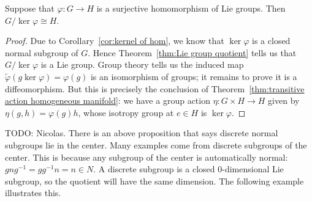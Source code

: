 \begin{theorem}
\label{thm:first iso}
Suppose that $\varphi: G \to H$ is a surjective homomorphism of Lie groups.
Then $G / \ker \varphi \cong H$.
\end{theorem}
\begin{proof}
Due to Corollary~\ref{cor:kernel of hom}, we know that $\ker \varphi$ is a closed normal subgroup of $G$.
Hence Theorem~\ref{thm:Lie group quotient} tells us that $G/\ker \varphi$ is a Lie group.
Group theory tells us the induced map $\tilde{\varphi}(g\ker\varphi) = \varphi(g)$ is an isomorphism of groups; it remains to prove it is a diffeomorphism.
But this is precisely the conclusion of Theorem~\ref{thm:transitive action homogeneous manifold}: we have a group action $\eta : G \times H \to H$ given by $\eta(g,h) = \varphi(g)h$, whose isotropy group at $e \in H$ is $\ker\varphi$.
\end{proof}

TODO: Nicolas. There is an above proposition that says discrete normal subgroups lie in the center.
Many examples come from discrete subgroups of the center.
This is because any subgroup of the center is automatically normal: $gng^{-1} = gg^{-1}n = n \in N$.
A discrete subgroup is a closed $0$-dimensional Lie subgroup, so the quotient will have the same dimension.
The following example illustrates this.

